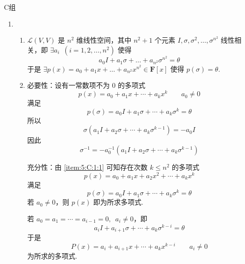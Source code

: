 \centerline{\heiti C组}
\begin{enumerate}
    \item \begin{enumerate}
              \item \label{item:5:C:1:1}
                    $ \mathcal{L}(V, V) $ 是 $ n^2 $ 维线性空间，其中 $ n^2 + 1 $ 个元素 $ I, \sigma, \sigma^2, \ldots, \sigma^{n^2} $ 线性相关，即 $ \exists a_i\enspace (i = 1, 2, \ldots, n^2) $ 使得
                    \[ a_0 I + a_1 \sigma + \ldots + a_{n^2} \sigma^{n^2} = \theta \]
                    于是 $ \exists p(x) = a_0 + a_1 x + \ldots + a_{n^2} x^{n^2} \in \mathbf{F}[x] $ 使得 $ p(\sigma) = \theta $.

              \item 必要性：设有一常数项不为 0 的多项式
                    \[ p(x) = a_0 + a_1 x + \cdots + a_k x^k \qquad a_0 \neq 0 \]
                    满足
                    \[ p(\sigma) = a_0 I + a_1 \sigma + \cdots + a_k \sigma^k = \theta \]
                    所以
                    \[ \sigma(a_1 I + a_2 \sigma + \cdots + a_k \sigma^{k - 1}) = -a_0 I \]
                    因此
                    \[ \sigma^{-1} = -a_0^{-1} (a_1 I + a_2 \sigma + \cdots + a_k \sigma^{k - 1}) \]

                    充分性：由 \ref*{item:5:C:1:1} 可知存在次数 $ k \leqslant n^2 $ 的多项式
                    \[ p(x) = a_0 + a_1 x + a_2 x^2 + \cdots + a_k x^k \]
                    满足
                    \[ p(\sigma) = a_0 I + a_1 \sigma + \cdots + a_k \sigma^k = \theta \]
                    若 $ a_0 \neq 0 $，则 $ p(x) $ 即为所求多项式.

                    若 $ a_0 = a_1 = \cdots = a_{i - 1} = 0,\enspace a_i \neq 0 $，即
                    \[ a_i I + a_{i + 1} \sigma + \cdots + a_k \sigma^{k - i} = \theta \]
                    于是
                    \[ P(x) = a_i + a_{i + 1} x + \cdots + a_k x^{k - i} \qquad a_i \neq 0 \]
                    为所求的多项式.
          \end{enumerate}
\end{enumerate}

\clearpage

